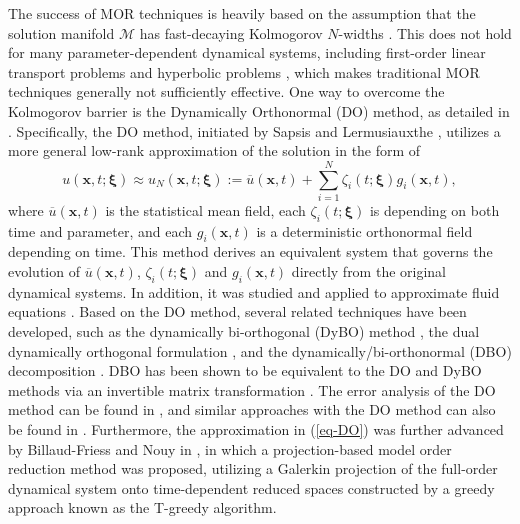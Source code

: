\documentclass[10pt,a4paper]{article}
\numberwithin{equation}{section}
\numberwithin{lemma}{section}
\numberwithin{example}{section}
\numberwithin{definition}{section}
\numberwithin{assumption}{section}
\numberwithin{theorem}{section}
\numberwithin{proposition}{section}
\numberwithin{corollary}{section}
\numberwithin{remark}{section}
\begin{document}
The success of MOR techniques is heavily based on the assumption that the solution manifold $\mathcal{M}$ has fast-decaying Kolmogorov $N$-widths \cite{A2012N-Widths,B2019Kolmo}.
This does not hold for many parameter-dependent dynamical systems, including first-order linear transport problems and hyperbolic problems \cite{M2016reduced,C2019decay,k2020model},
which makes traditional MOR techniques generally not sufficiently effective. 
One way to overcome the Kolmogorov barrier is the Dynamically Orthonormal (DO) method, as detailed in \cite{B2022breaking,D2023manifold}.
Specifically, the DO method, initiated by Sapsis and Lermusiauxthe \cite{Sapsis2009dynamical}, utilizes a more general low-rank approximation of the solution in the form of 
\begin{equation}
\label{eq-DO}
u(\bm{x},t;\bm{\xi})\approx u_N(\bm{x},t;\bm{\xi}):=\overline{u}(\bm{x},t)+\sum_{i=1}^{N}\zeta_i(t;\bm{\xi})g_i(\bm{x},t),
\end{equation}
where $\overline{u}(\bm{x},t)$ is the statistical mean field,
each $\zeta_i(t;\bm{\xi})$ is depending on both time and parameter,
and each $g_i(\bm{x},t)$ is a deterministic orthonormal field depending on time. 
This method derives an equivalent system that governs the evolution of $\overline{u}(\bm{x},t)$, $\zeta_i(t;\bm{\xi})$ and $g_i(\bm{x},t)$ directly from the original dynamical systems. 
In addition, it was studied and applied to approximate fluid equations \cite{Sapsis2012dynamical,Ueckermann2013numerical}. 
Based on the DO method, several related techniques have been developed, such as the dynamically bi-orthogonal (DyBO) method \cite{Cheng2013a1,Cheng2013a2}, the dual dynamically orthogonal formulation \cite{Musharbash2018dual}, and the dynamically/bi-orthonormal (DBO) decomposition \cite{Patil2020real-time}. 
DBO has been shown to be equivalent to the DO and DyBO methods via an invertible matrix transformation \cite{Patil2020real-time}. 
The error analysis of the DO method can be found in \cite{Musharbash2015error,Feppon2018a}, and
similar approaches with the DO method can also be found in \cite{Beck2000the,Othmar2007dynamical,Koch2007regularity}.
Furthermore, the approximation in (\ref{eq-DO}) was further advanced by Billaud-Friess and Nouy in \cite{Friess2017DynamicalMR}, in which a projection-based model order reduction method was proposed, utilizing a Galerkin projection of the full-order dynamical system onto time-dependent reduced spaces constructed by a greedy approach known as the T-greedy algorithm.
	
\end{document}
